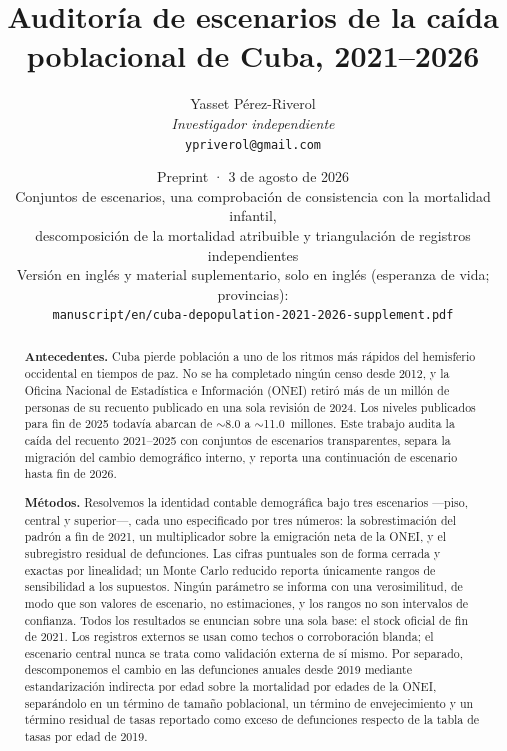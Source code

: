 \documentclass[11pt,a4paper]{article}
\title{Auditoría de escenarios de la caída poblacional de Cuba, 2021--2026}
\author{Yasset P\'erez-Riverol\\
\textit{Investigador independiente}\\
\texttt{ypriverol@gmail.com}}
\date{Preprint · 3 de agosto de 2026\\[0.35em]
\normalsize Conjuntos de escenarios, una comprobación de consistencia con la mortalidad infantil,\\
descomposición de la mortalidad atribuible y triangulación de registros independientes\\[0.4em]
\footnotesize Versión en inglés y material suplementario, solo en inglés (esperanza de vida; provincias):\\
\texttt{manuscript/en/cuba-depopulation-2021-2026-supplement.pdf}}
\begin{document}
\maketitle

\begin{abstract}
\textbf{Antecedentes.}
Cuba pierde población a uno de los ritmos más rápidos del hemisferio occidental en tiempos de paz.
No se ha completado ningún censo desde 2012, y la Oficina Nacional de Estadística e Información (ONEI) retiró más de un millón de personas de su recuento publicado en una sola revisión de 2024.
Los niveles publicados para fin de 2025 todavía abarcan de $\sim$8.0 a $\sim$11.0~millones.
Este trabajo audita la caída del recuento 2021--2025 con conjuntos de escenarios transparentes, separa la migración del cambio demográfico interno, y reporta una continuación de escenario hasta fin de 2026.

\textbf{Métodos.}
Resolvemos la identidad contable demográfica bajo tres escenarios ---piso, central y superior---, cada uno especificado por tres números: la sobrestimación del padrón a fin de 2021, un multiplicador sobre la emigración neta de la ONEI, y el subregistro residual de defunciones.
Las cifras puntuales son de forma cerrada y exactas por linealidad; un Monte Carlo reducido reporta únicamente rangos de sensibilidad a los supuestos.
Ningún parámetro se informa con una verosimilitud, de modo que son valores de escenario, no estimaciones, y los rangos no son intervalos de confianza.
Todos los resultados se enuncian sobre una sola base: el stock oficial de fin de 2021.
Los registros externos se usan como techos o corroboración blanda; el escenario central nunca se trata como validación externa de sí mismo.
Por separado, descomponemos el cambio en las defunciones anuales desde 2019 mediante estandarización indirecta por edad sobre la mortalidad por edades de la ONEI, separándolo en un término de tamaño poblacional, un término de envejecimiento y un término residual de tasas reportado como exceso de defunciones respecto de la tabla de tasas por edad de 2019.


\end{abstract}
\end{document}
